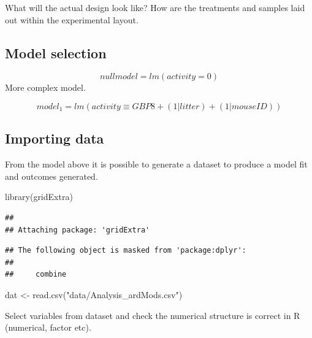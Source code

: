 \documentclass[
]{book}
\newenvironment{Shaded}{\begin{snugshade}}{\end{snugshade}}
\newcommand{\CommentTok}[1]{\textcolor[rgb]{0.56,0.35,0.01}{\textit{#1}}}
\newcommand{\FunctionTok}[1]{\textcolor[rgb]{0.00,0.00,0.00}{#1}}
\newcommand{\NormalTok}[1]{#1}
\newcommand{\OtherTok}[1]{\textcolor[rgb]{0.56,0.35,0.01}{#1}}
\newcommand{\SpecialCharTok}[1]{\textcolor[rgb]{0.00,0.00,0.00}{#1}}
\newcommand{\StringTok}[1]{\textcolor[rgb]{0.31,0.60,0.02}{#1}}
\begin{document}
What will the actual design look like? How are the treatments and samples laid out within the experimental layout.

\hypertarget{model-selection}{%
\subsection{Model selection}\label{model-selection}}

\[ null model = lm(activity = 0) \]
More complex model.

\[ model_1 = lm(activity \equiv GBP8 + (1|litter) + (1|mouseID)) \]

\hypertarget{importing-data}{%
\subsection{Importing data}\label{importing-data}}

From the model above it is possible to generate a dataset to produce a model fit and outcomes generated.

\begin{Shaded}
\begin{Highlighting}[]
\FunctionTok{library}\NormalTok{(gridExtra)}
\end{Highlighting}
\end{Shaded}

\begin{verbatim}
## 
## Attaching package: 'gridExtra'
\end{verbatim}

\begin{verbatim}
## The following object is masked from 'package:dplyr':
## 
##     combine
\end{verbatim}

\begin{Shaded}
\begin{Highlighting}[]
\NormalTok{dat }\OtherTok{\textless{}{-}} \FunctionTok{read.csv}\NormalTok{(}\StringTok{"data/Analysis\_ardMods.csv"}\NormalTok{)}
\end{Highlighting}
\end{Shaded}

Select variables from dataset and check the numerical structure is correct in R (numerical, factor etc).

\begin{Shaded}
\end{Shaded}
\end{document}

